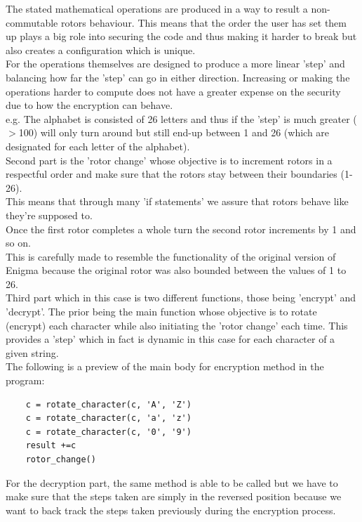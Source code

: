 \documentclass[conference,compsoc]{IEEEtran}
\begin{document}
The stated mathematical operations are produced in a way to result a non-commutable rotors behaviour. This means that the order the user has set them up plays a big role into securing the code and thus making it harder to break but also creates a configuration which is unique.\\ 
For the operations themselves are designed to produce a more linear 'step' and balancing how far the 'step' can go in either direction. Increasing or making the operations harder to compute does not have a greater expense on the security due to how the encryption can behave.\\
e.g. The alphabet is consisted of 26 letters and thus if the 'step' is much greater ($>$100) will only turn around but still end-up between 1 and 26 (which are designated for each letter of the alphabet).\\

Second part is the 'rotor change' whose objective is to increment rotors in a respectful order and make sure that the rotors stay between their boundaries (1-26).\\
This means that through many 'if statements' we assure that rotors behave like they're supposed to.\\
Once the first rotor completes a whole turn the second rotor increments by 1 and so on.\\
This is carefully made to resemble the functionality of the original version of Enigma because the original rotor was also bounded between the values of 1 to 26.\\

Third part which in this case is two different functions, those being 'encrypt' and 'decrypt'. The prior being the main function whose objective is to rotate (encrypt) each character while also initiating the 'rotor change' each time. This provides a 'step' which in fact is dynamic in this case for each character of a given string.\\

The following is a preview of the main body for encryption method in the program:
\begin{verbatim}
    c = rotate_character(c, 'A', 'Z')
    c = rotate_character(c, 'a', 'z')
    c = rotate_character(c, '0', '9')
    result +=c
    rotor_change()
\end{verbatim}

For the decryption part, the same method is able to be called but we have to make sure that the steps taken are simply in the reversed position because we want to back track the steps taken previously during the encryption process.\\
\end{document}
